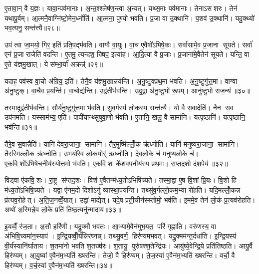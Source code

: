 ए॒तावा॒न् वै य॒ज्ञः। यावा॒न्पव॑मानाः। अ॒न्त॒श्श्लेष॑ण॒न्त्वा अ॒न्यत्। यथ्स॒माः पव॑मानाः। तेनाऽसशरः। तेन॑ यथापू॒र्वम्। आ॒त्मनै॒वाग्नि॑ष्टो॒मेन॒र्ध्नोति॑। आ॒त्मना॒ पुण्यो॑ भवति। प्र॒जा वा उ॒क्थानि॑। प॒शव॑ उ॒क्थानि॑। यदु॒क्थ्यो॑ भव॒त्यनु॒ सन्त॑त्त्यै॥२८॥\anuvakamend[स्तोमा प॒शव॑ उ॒क्थान्येक॑ञ्च]

उप॑ त्वा जा॒मयो॒ गिर॒ इति॑ प्रति॒पद्भ॑वति। वाग्वै वा॒युः। वा॒च ए॒वैषो॑ऽभिषे॒कः। सर्वा॑सामे॒व प्र॒जाना सूयते। सर्वा॑ एनं प्र॒जा राजेति॑ वदन्ति। ए॒तमु॒ त्यन्दश॒ ख्षिप॒ इत्या॑ह। आ॒दि॒त्या वै प्र॒जाः। प्र॒जाना॑मे॒वैतेन॑ सूयते। यन्ति॒ वा ए॒ते य॑ज्ञमु॒खात्। ये स॑म्भा॒र्या॑ अक्रन्न्॑॥२९॥

यदाह॒ पव॑स्व वा॒चो अ॑ग्रिय॒ इति॑। तेनै॒व य॑ज्ञमु॒खान्नय॑न्ति। अ॒नु॒ष्टुक्प्र॑थ॒मा भ॑वति। अ॒नु॒ष्टुगु॑त्त॒मा। वाग्वा अ॑नु॒ष्टुक्। वा॒चैव प्र॒यन्ति॑। वा॒चोद्य॑न्ति। उद्व॑तीर्भवन्ति। उद्व॒द्वा अ॑नु॒ष्टुभो॑ रू॒पम्। आनु॑ष्टुभो राज॒न्य॑॥३०॥

तस्मा॒दुद्व॑तीर्भवन्ति। सौ॒र्य॑नु॒ष्टुगु॑त्त॒मा भ॑वति। सु॒व॒र्गस्य॑ लो॒कस्य॒ सन्त॑त्यै। यो वै स॒वादेति॑। नैन स॒व उप॑नमति। यस्साम॑भ्य॒ एति॑। पापी॑यान्थ्सुषुवा॒णो भ॑वति। ए॒तानि॒ खलु॒ वै सामा॑नि। यत्पृ॒ष्ठानि॑। यत्पृ॒ष्ठानि॒ भव॑न्ति॥३१॥

तैरे॒व स॒वान्नैति॑। यानि॑ देवरा॒जाना॒ सामा॑नि। तैर॒मुष्मि॑ल्लोँ॒क ऋ॑ध्नोति। यानि॑ मनुष्यरा॒जाना॒ सामा॑नि। तैर॒स्मिल्लोँ॒क ऋ॑ध्नोति। उ॒भयो॑रे॒व लो॒कयोर्॑ ऋध्नोति। दे॒व॒लो॒के च॑ मनुष्यलो॒के च॑। ए॒क॒वि॒शो॑ऽभिषेच॒नीय॑स्योत्त॒मो भ॑वति। ए॒क॒वि॒शः के॑शवप॒नीय॑स्य प्रथ॒मः। स॒प्त॒द॒शो द॑श॒पेय॑॥३२॥

विड्वा ए॑कवि॒शः। रा॒ष्ट्र स॑प्तद॒शः। विश॑ ए॒वैतन्म॑ध्य॒तो॑ऽभिषि॑च्यते। तस्मा॒द्वा ए॒ष वि॒शां प्रि॒यः। वि॒शो हि म॑ध्य॒तो॑ऽभिषि॒च्यते। यद्वा ए॑नम॒दो दिशोऽनु॑ व्यास्था॒पय॑न्ति। तथ्सु॑व॒र्गल्लो॒कम॒भ्या रो॑हति। यदि॒मल्लोँ॒कन्न प्र॑त्यव॒रोहेत्। अ॒ति॒ज॒नव्वेँ॒यात्। उद्वा॑ माद्येत्। यदे॒ष प्र॑ती॒चीन॑स्स्तोमो॒ भव॑ति। इ॒ममे॒व तेन॑ लो॒कं प्र॒त्यव॑रोहति। अथो॑ अ॒स्मिन्ने॒व लो॒के प्रति॑ तिष्ठ॒त्यनु॑न्मादाय॥३३॥\anuvakamend[अक्र॑न्राज॒न्यो॑ भव॑न्ति दश॒पेयो॑ माद्ये॒त्रीणि॑ च]

इ॒यव्वैँ॒ र॑ज॒ता। अ॒सौ हरि॑णी। यद्रु॒क्मौ भव॑तः। आ॒भ्यामे॒वैन॑मुभ॒यत॒ परि॑ गृह्णाति। वरु॑णस्य॒ वा अ॑भिषि॒च्यमा॑न॒स्याप॑। इ॒न्द्रि॒यव्वीँ॒र्य॑न्निर॑घ्नन्न्। तथ्सु॒वर्ण॒ हिर॑ण्यमभवत्। यद्रु॒क्मम॑न्त॒र्दधा॑ति। इ॒न्द्रि॒यस्य॑ वी॒र्य॑स्यानि॑र्घाताय। श॒तमा॑नो भवति श॒तख्ष॑रः। श॒तायु॒ पुरु॑षश्श॒तेन्द्रि॑यः। आयु॑ष्ये॒वेन्द्रि॒ये प्रति॑तिष्ठति। आयु॒र्वै हिर॑ण्यम्। आ॒यु॒ष्या॑ ए॒वैन॑म॒भ्यति॑ ख्षरन्ति। तेजो॒ वै हिर॑ण्यम्। ते॒ज॒स्या॑ ए॒वैन॑म॒भ्यति॑ ख्षरन्ति। वर्चो॒ वै हिर॑ण्यम्। व॒र्च॒स्या॑ ए॒वैन॑म॒भ्यति॑ ख्षरन्ति॥३४॥\anuvakamend[श॒तख्ष॑रो॒ऽष्टौ च॑]

